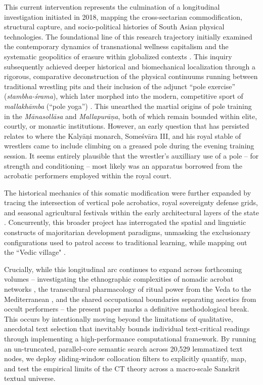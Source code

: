 \documentclass[11pt,twoside,letterpaper]{article}
\begin{document}
This current intervention represents the culmination of a longitudinal investigation initiated in 2018, mapping the cross-sectarian commodification, structural capture, and socio-political histories of South Asian physical technologies. The foundational line of this research trajectory initially examined the contemporary dynamics of transnational wellness capitalism and the systematic geopolitics of erasure within globalized contexts \citep{mccartney2021}. This inquiry subsequently achieved deeper historical and biomechanical localization through a rigorous, comparative deconstruction of the physical continuums running between traditional wrestling pits and their inclusion of the adjunct ``pole exercise'' (\textit{stambha-śrama}), which later morphed into the modern, competitive sport of \textit{mallakhāmba} (``pole yoga'')  \citep{mccartney2023}. This unearthed the martial origins of pole training in the \textit{Mānasollāsa} and \textit{Mallapurāṇa}, both of which remain bounded within elite, courtly, or monastic institutions. However, an early question that has persisted relates to where the Kalyāṇi monarch, Someśvāra III, and his royal stable of wrestlers came to include climbing on a greased pole during the evening training session. It seems entirely plausible that the wrestler's auxilliary use of a pole -- for strength and conditioning -- most likely was an apparatus borrowed from the acrobatic performers employed within the royal court.

The historical mechanics of this somatic modification were further expanded by tracing the intersection of vertical pole acrobatics, royal sovereignty defense grids, and seasonal agricultural festivals within the early architectural layers of the state \citep{mccartney2025}. Concurrently, this broader project has interrogated the spatial and linguistic constructs of majoritarian development paradigms, unmasking the exclusionary configurations used to patrol access to traditional learning, while mapping out the ``Vedic village" \citep{mccartney2026}.

Crucially, while this longitudinal arc continues to expand across forthcoming volumes -- investigating the ethnographic complexities of nomadic acrobat networks \citep{mccartneyforthcomingA}, the transcultural pharmacology of ritual power from the Veda to the Mediterranean \citep{mccartneyforthcomingB}, and the shared occupational boundaries separating ascetics from occult performers \citep{mccartneyforthcomingC} -- the present paper marks a definitive methodological break. This occurs by intentionally moving beyond the limitations of qualitative, anecdotal text selection that inevitably bounds individual text-critical readings through implementing a high-performance computational framework. By running an un-truncated, parallel-core semantic search across 20,529 lemmatized text nodes, we deploy sliding-window collocation filters to explicitly quantify, map, and test the empirical limits of the CT theory across a macro-scale Sanskrit textual universe.
\end{document}
